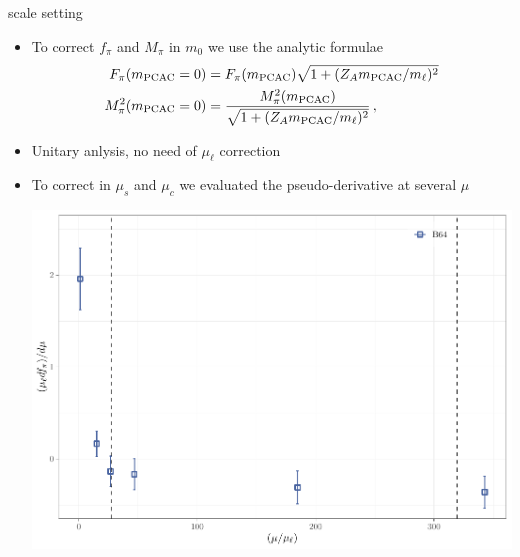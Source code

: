 \documentclass[xcolor={dvipsnames,table}]{beamer}
\begin{document}
\begin{frame}{scale setting}
  \begin{itemize}
    \item To correct $f_\pi$ and $M_\pi$ in $m_0$ we use the analytic formulae
          \begin{align*}
            F_{\pi}(m_{\rm PCAC}=0)   & =F_{\pi}(m_{\rm PCAC})\sqrt{1+(Z_A m_{\rm PCAC}/ m_\ell)^2}               \\
            M_{\pi}^2(m_{\rm PCAC}=0) & = \frac{M_{\pi}^2(m_{\rm PCAC})}{\sqrt{1+(Z_A m_{\rm PCAC}/m_\ell)^2}}\,,
          \end{align*}
    \item<2-> Unitary anlysis, no need of $\mu_\ell$ correction
    \item<3->  To correct in $\mu_s$ and $\mu_c$ we evaluated the pseudo-derivative at several $\mu$
          \begin{center}
            \includegraphics[scale=0.5]{plots/der_fpi_B64.pdf}
          \end{center}
  \end{itemize}
\end{frame}
\end{document}
